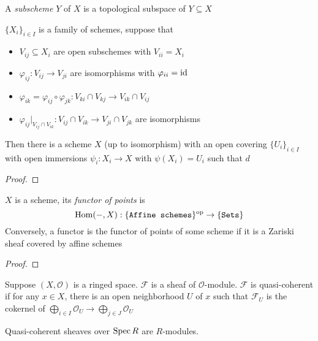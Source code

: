\documentclass[main]{subfiles}
\begin{document}
\begin{definition}
A \textit{subscheme} $Y$ of $X$ is a topological subspace of $Y\subseteq X$
\end{definition}

\begin{proposition}
$\{X_i\}_{i\in I}$ is a family of schemes, suppose that
\begin{itemize}
\item $V_{ij}\subseteq X_i$ are open subschemes with $V_{ii}=X_i$
\item $\varphi_{ij}:V_{ij}\to V_{ji}$ are isomorphisms with $\varphi_{ii}=\operatorname{id}$
\item $\varphi_{ik}=\varphi_{ij}\circ\varphi_{jk}:V_{ki}\cap V_{kj}\to V_{ik}\cap V_{ij}$
\item $\varphi_{ij}|_{V_{ij}\cap V_{ik}}:V_{ij}\cap V_{ik}\to V_{ji}\cap V_{jk}$ are isomorphisms
\end{itemize}
Then there is a scheme $X$ (up to isomorphism) with an open covering $\{U_i\}_{i\in I}$ with open immersions $\psi_i:X_i\to X$ with $\psi(X_i)=U_i$ such that $d$
\end{proposition}

\begin{proof}

\end{proof}

\begin{lemma}
$X$ is a scheme, its \textit{functor of points} is
\[\operatorname{Hom}(-,X):\{\texttt{Affine schemes}\}^{\text{op}}\to\{\texttt{Sets}\}\]
Conversely, a functor is the functor of points of some scheme if it is a Zariski sheaf covered by affine schemes
\end{lemma}

\begin{proof}

\end{proof}

\begin{definition}
Suppose $(X,\mathcal O)$ is a ringed space. $\mathcal F$ is a sheaf of $\mathcal O$-module. $\mathcal F$ is quasi-coherent if for any $x\in X$, there is an open neighborhood $U$ of $x$ such that $\mathcal F_U$ is the cokernel of $\bigoplus_{i\in I}\mathcal O_U\to \bigoplus_{j\in J}\mathcal O_U$
\end{definition}

\begin{proposition}
Quasi-coherent sheaves over $\operatorname{Spec} R$ are $R$-modules.
\end{proposition}
\end{document}

